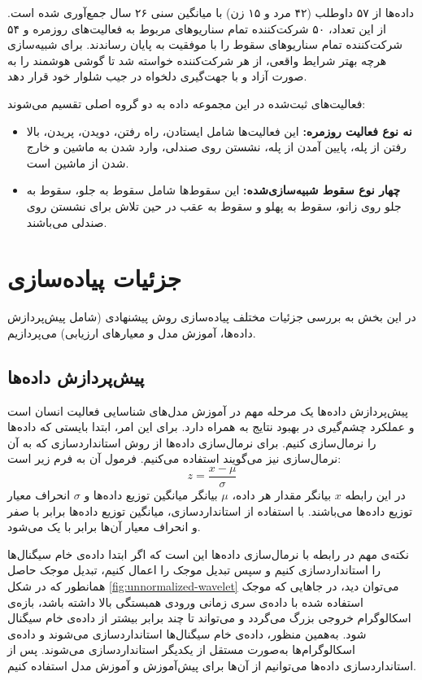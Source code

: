 داده‌ها از ۵۷ داوطلب (۴۲ مرد و ۱۵ زن) با میانگین سنی ۲۶ سال جمع‌آوری شده است. از این تعداد، ۵۰ شرکت‌کننده تمام سناریوهای مربوط به فعالیت‌های روزمره و ۵۴ شرکت‌کننده تمام سناریوهای سقوط را با موفقیت به پایان رساندند. برای شبیه‌سازی هرچه بهتر شرایط واقعی، از هر شرکت‌کننده خواسته شد تا گوشی هوشمند را به صورت آزاد و با جهت‌گیری دلخواه در جیب شلوار خود قرار دهد.

فعالیت‌های ثبت‌شده در این مجموعه داده به دو گروه اصلی تقسیم می‌شوند:
\begin{itemize}
    \item\textbf{نه نوع فعالیت روزمره:}  این فعالیت‌ها شامل ایستادن، راه رفتن، دویدن، پریدن، بالا رفتن از پله، پایین آمدن از پله، نشستن روی صندلی، وارد شدن به ماشین و خارج شدن از ماشین است.
    \item\textbf{چهار نوع سقوط شبیه‌سازی‌شده:}  این سقوط‌ها شامل سقوط به جلو، سقوط به جلو روی زانو، سقوط به پهلو و سقوط به عقب در حین تلاش برای نشستن روی صندلی می‌باشند.
\end{itemize}

\section{جزئیات پیاده‌سازی}

در این بخش به بررسی جزئیات مختلف پیاده‌سازی روش پیشنهادی (شامل پیش‌پردازش داده‌ها، آموزش مدل و معیارهای ارزیابی) می‌پردازیم.

\subsection{پیش‌پردازش داده‌ها}

پیش‌پردازش داده‌ها یک مرحله مهم در آموزش مدل‌های شناسایی فعالیت انسان است و عملکرد چشم‌گیری در بهبود نتایج به همراه دارد. برای این امر، ابتدا بایستی که داده‌ها را نرمال‌سازی کنیم. برای نرمال‌سازی داده‌ها از روش استانداردسازی که به آن نرمال‌سازی  نیز می‌گویند استفاده می‌کنیم. فرمول آن به فرم زیر است:
\begin{equation}
    z=\frac{x-\mu}{\sigma}
\end{equation}
در این رابطه $x$ بیانگر مقدار هر داده، $\mu$ بیانگر میانگین توزیع داده‌ها و $\sigma$ انحراف معیار توزیع داده‌ها می‌باشند. با استفاده از استانداردسازی، میانگین توزیع داده‌ها برابر با صفر و انحراف معیار آن‌ها برابر با یک می‌شود.

نکته‌ی مهم در رابطه با نرمال‌سازی داده‌ها این است که اگر ابتدا داده‌ی خام سیگنال‌ها را استانداردسازی کنیم و سپس تبدیل موجک را اعمال کنیم، تبدیل موجک حاصل همانطور که در شکل \ref{fig:unnormalized-wavelet}
می‌توان دید، در جاهایی که موجک استفاده شده با داده‌ی سری زمانی ورودی همبستگی بالا داشته باشد، بازه‌ی اسکالوگرام خروجی بزرگ می‌گردد و می‌تواند تا چند برابر بیشتر از داده‌ی خام سیگنال شود. به‌همین منظور، داده‌ی خام سیگنال‌ها  استانداردسازی می‌شوند و داده‌ی اسکالوگرام‌ها به‌صورت مستقل از یکدیگر استانداردسازی می‌شوند. پس از استانداردسازی داده‌ها می‌توانیم از آن‌ها برای پیش‌آموزش و آموزش مدل استفاده کنیم.

